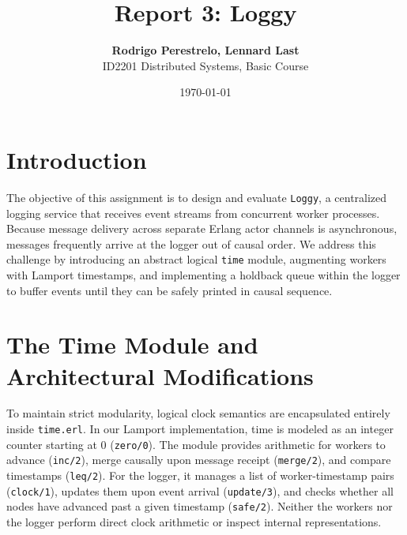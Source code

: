 \documentclass[a4paper, 11pt]{article}
\title{\textbf{Report 3: Loggy}}
\author{\textbf{Rodrigo Perestrelo, Lennard Last} \\ ID2201 Distributed Systems, Basic Course}
\date{\today{}}
\begin{document}
\maketitle

\section{Introduction}

The objective of this assignment is to design and evaluate \texttt{Loggy}, a centralized logging service that receives event streams from concurrent worker processes. Because message delivery across separate Erlang actor channels is asynchronous, messages frequently arrive at the logger out of causal order. We address this challenge by introducing an abstract logical \texttt{time} module, augmenting workers with Lamport timestamps, and implementing a holdback queue within the logger to buffer events until they can be safely printed in causal sequence.

\section{The Time Module and Architectural Modifications}

To maintain strict modularity, logical clock semantics are encapsulated entirely inside \texttt{time.erl}. In our Lamport implementation, time is modeled as an integer counter starting at 0 (\texttt{zero/0}). The module provides arithmetic for workers to advance (\texttt{inc/2}), merge causally upon message receipt (\texttt{merge/2}), and compare timestamps (\texttt{leq/2}). For the logger, it manages a list of worker-timestamp pairs (\texttt{clock/1}), updates them upon event arrival (\texttt{update/3}), and checks whether all nodes have advanced past a given timestamp (\texttt{safe/2}). Neither the workers nor the logger perform direct clock arithmetic or inspect internal representations.
\end{document}
